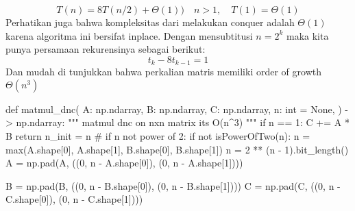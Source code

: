 \documentclass[
  letterpaper,
  DIV=11,
  numbers=noendperiod]{scrartcl}
\newenvironment{Shaded}{\begin{snugshade}}{\end{snugshade}}
\newcommand{\BuiltInTok}[1]{\textcolor[rgb]{0.00,0.23,0.31}{#1}}
\newcommand{\CommentTok}[1]{\textcolor[rgb]{0.37,0.37,0.37}{#1}}
\newcommand{\ControlFlowTok}[1]{\textcolor[rgb]{0.00,0.23,0.31}{#1}}
\newcommand{\DecValTok}[1]{\textcolor[rgb]{0.68,0.00,0.00}{#1}}
\newcommand{\KeywordTok}[1]{\textcolor[rgb]{0.00,0.23,0.31}{#1}}
\newcommand{\NormalTok}[1]{\textcolor[rgb]{0.00,0.23,0.31}{#1}}
\newcommand{\OperatorTok}[1]{\textcolor[rgb]{0.37,0.37,0.37}{#1}}
\newcommand{\VariableTok}[1]{\textcolor[rgb]{0.07,0.07,0.07}{#1}}
\begin{document}
\[T(n)=8 T(n / 2)+\Theta(1))\quad n>1, \quad T(1)=\Theta(1)\] Perhatikan
juga bahwa kompleksitas dari melakukan conquer adalah \(\Theta(1)\)
karena algoritma ini bersifat inplace. Dengan mensubtitusi \(n=2^k\)
maka kita punya persamaan rekurensinya sebagai berikut:
\[ t_k - 8t_{k-1} = 1\] Dan mudah di tunjukkan bahwa perkalian matris
memiliki order of growth \(\Theta(n^3)\)

\begin{Shaded}
\begin{Highlighting}[]
\KeywordTok{def}\NormalTok{ matmul\_dnc(}
\NormalTok{    A: np.ndarray,}
\NormalTok{    B: np.ndarray,}
\NormalTok{    C: np.ndarray,}
\NormalTok{    n: }\BuiltInTok{int} \OperatorTok{=} \VariableTok{None}\NormalTok{,}
\NormalTok{) }\OperatorTok{{-}\textgreater{}}\NormalTok{ np.ndarray:}
    \CommentTok{"""}
\CommentTok{    matmul dnc on nxn matrix it\textquotesingle{}s O(n\^{}3)}
\CommentTok{    """}
    \ControlFlowTok{if}\NormalTok{ n }\OperatorTok{==} \DecValTok{1}\NormalTok{:}
\NormalTok{        C }\OperatorTok{+=}\NormalTok{ A }\OperatorTok{*}\NormalTok{ B}
        \ControlFlowTok{return}
\NormalTok{    n\_init }\OperatorTok{=}\NormalTok{ n}
    \CommentTok{\# if n not power of 2:}
    \ControlFlowTok{if} \KeywordTok{not}\NormalTok{ isPowerOfTwo(n):}
\NormalTok{        n }\OperatorTok{=} \BuiltInTok{max}\NormalTok{(A.shape[}\DecValTok{0}\NormalTok{], A.shape[}\DecValTok{1}\NormalTok{], B.shape[}\DecValTok{0}\NormalTok{], B.shape[}\DecValTok{1}\NormalTok{])}
\NormalTok{        n }\OperatorTok{=} \DecValTok{2} \OperatorTok{**}\NormalTok{ (n }\OperatorTok{{-}} \DecValTok{1}\NormalTok{).bit\_length()}
\NormalTok{        A }\OperatorTok{=}\NormalTok{ np.pad(A, ((}\DecValTok{0}\NormalTok{, n }\OperatorTok{{-}}\NormalTok{ A.shape[}\DecValTok{0}\NormalTok{]), (}\DecValTok{0}\NormalTok{, n }\OperatorTok{{-}}\NormalTok{ A.shape[}\DecValTok{1}\NormalTok{])))}

\NormalTok{        B }\OperatorTok{=}\NormalTok{ np.pad(B, ((}\DecValTok{0}\NormalTok{, n }\OperatorTok{{-}}\NormalTok{ B.shape[}\DecValTok{0}\NormalTok{]), (}\DecValTok{0}\NormalTok{, n }\OperatorTok{{-}}\NormalTok{ B.shape[}\DecValTok{1}\NormalTok{])))}
\NormalTok{        C }\OperatorTok{=}\NormalTok{ np.pad(C, ((}\DecValTok{0}\NormalTok{, n }\OperatorTok{{-}}\NormalTok{ C.shape[}\DecValTok{0}\NormalTok{]), (}\DecValTok{0}\NormalTok{, n }\OperatorTok{{-}}\NormalTok{ C.shape[}\DecValTok{1}\NormalTok{])))}


\end{Highlighting}
\end{Shaded}
\end{document}
